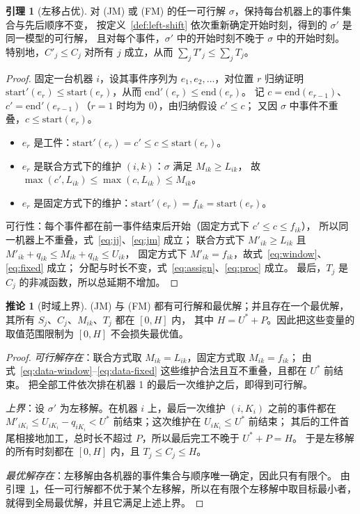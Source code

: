 \documentclass[11pt,oneside,notitlepage]{ctexrep}
\theoremstyle{definition}
\newtheorem{lemma}[definition]{引理}
\newtheorem{corollary}[definition]{推论}
\theoremstyle{remark}
\newcommand{\Ustar}{U^{*}}
\begin{document}
\begin{lemma}[左移占优]\label{lem:left-shift}
对 (JM) 或 (FM) 的任一可行解 $\sigma$，保持每台机器上的事件集合与先后顺序不变，
按定义~\ref{def:left-shift} 依次重新确定开始时刻，得到的 $\sigma'$ 是同一模型的可行解，
且对每个事件，$\sigma'$ 中的开始时刻不晚于 $\sigma$ 中的开始时刻。
特别地，$C'_j\le C_j$ 对所有 $j$ 成立，从而 $\sum_j T'_j\le\sum_j T_j$。
\end{lemma}

\begin{proof}
固定一台机器 $i$，设其事件序列为 $e_1,e_2,\dots$，对位置 $r$ 归纳证明
$\mathrm{start}'(e_r)\le\mathrm{start}(e_r)$，从而 $\mathrm{end}'(e_r)\le\mathrm{end}(e_r)$。
记 $c=\mathrm{end}(e_{r-1})$、$c'=\mathrm{end}'(e_{r-1})$（$r=1$ 时均为 0），由归纳假设 $c'\le c$；
又因 $\sigma$ 中事件不重叠，$c\le\mathrm{start}(e_r)$。
\begin{itemize}[nosep]
  \item $e_r$ 是工件：$\mathrm{start}'(e_r)=c'\le c\le\mathrm{start}(e_r)$。
  \item $e_r$ 是联合方式下的维护 $(i,k)$：$\sigma$ 满足 $M_{ik}\ge L_{ik}$，
        故 $\max(c',L_{ik})\le\max(c,L_{ik})\le M_{ik}$。
  \item $e_r$ 是固定方式下的维护：$\mathrm{start}'(e_r)=f_{ik}=\mathrm{start}(e_r)$。
\end{itemize}
可行性：每个事件都在前一事件结束后开始（固定方式下 $c'\le c\le f_{ik}$），
所以同一机器上不重叠，式~\eqref{eq:jj}、\eqref{eq:jm} 成立；
联合方式下 $M'_{ik}\ge L_{ik}$ 且 $M'_{ik}+q_{ik}\le M_{ik}+q_{ik}\le U_{ik}$，
固定方式下 $M'_{ik}=f_{ik}$，故式~\eqref{eq:window}、\eqref{eq:fixed} 成立；
分配与时长不变，式~\eqref{eq:assign}、\eqref{eq:proc} 成立。
最后，$T_j$ 是 $C_j$ 的非减函数，所以总延期不增加。
\end{proof}

\begin{corollary}[时域上界]\label{cor:horizon}
(JM) 与 (FM) 都有可行解和最优解；并且存在一个最优解，其所有 $S_j$、$C_j$、$M_{ik}$、$T_j$ 都在 $[0,H]$ 内，
其中 $H=\Ustar+P$。因此把这些变量的取值范围限制为 $[0,H]$ 不会损失最优值。
\end{corollary}

\begin{proof}
\emph{可行解存在}：联合方式取 $M_{ik}=L_{ik}$，固定方式取 $M_{ik}=f_{ik}$；
由式~\eqref{eq:data-window}--\eqref{eq:data-fixed} 这些维护合法且互不重叠，且都在 $\Ustar$ 前结束。
把全部工件依次排在机器 1 的最后一次维护之后，即得到可行解。

\emph{上界}：设 $\sigma'$ 为左移解。在机器 $i$ 上，最后一次维护 $(i,K_i)$ 之前的事件都在
$M'_{iK_i}\le U_{iK_i}-q_{iK_i}<\Ustar$ 前结束；这次维护在 $U_{iK_i}\le\Ustar$ 前结束；
其后的工件首尾相接地加工，总时长不超过 $P$，所以最后完工不晚于 $\Ustar+P=H$。
于是左移解的所有时刻都在 $[0,H]$ 内，且 $T_j\le C_j\le H$。

\emph{最优解存在}：左移解由各机器的事件集合与顺序唯一确定，因此只有有限个。
由引理~\ref{lem:left-shift}，任一可行解都不优于某个左移解，所以在有限个左移解中取目标最小者，
就得到全局最优解，并且它满足上述上界。
\end{proof}
\end{document}
